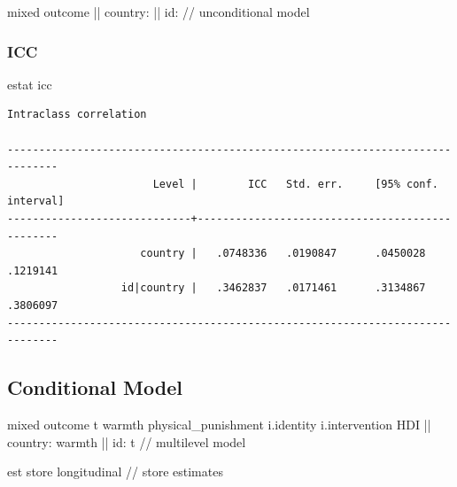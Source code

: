 \documentclass[
  letterpaper,
  DIV=11,
  numbers=noendperiod]{scrreprt}
\newenvironment{Shaded}{\begin{snugshade}}{\end{snugshade}}
\newcommand{\CommentTok}[1]{\textcolor[rgb]{0.37,0.37,0.37}{#1}}
\newcommand{\KeywordTok}[1]{\textcolor[rgb]{0.00,0.23,0.31}{#1}}
\newcommand{\NormalTok}[1]{\textcolor[rgb]{0.00,0.23,0.31}{#1}}
\begin{document}
\begin{Shaded}
\begin{Highlighting}[]
\NormalTok{mixed outcome || country: || id: }\CommentTok{// unconditional model}
\end{Highlighting}
\end{Shaded}

\subsubsection{ICC}\label{icc-1}

\begin{Shaded}
\begin{Highlighting}[]

\KeywordTok{estat}\NormalTok{ icc}
\end{Highlighting}
\end{Shaded}

\begin{verbatim}
Intraclass correlation

------------------------------------------------------------------------------
                       Level |        ICC   Std. err.     [95% conf. interval]
-----------------------------+------------------------------------------------
                     country |   .0748336   .0190847      .0450028    .1219141
                  id|country |   .3462837   .0171461      .3134867    .3806097
------------------------------------------------------------------------------
\end{verbatim}

\subsection{Conditional Model}\label{conditional-model-1}

\begin{Shaded}
\begin{Highlighting}[]

\NormalTok{mixed outcome t warmth physical\_punishment i.}\KeywordTok{identity}\NormalTok{ i.intervention HDI || country: warmth || id: t }\CommentTok{// multilevel model}

\KeywordTok{est} \KeywordTok{store}\NormalTok{ longitudinal }\CommentTok{// store estimates}
\end{Highlighting}
\end{Shaded}
\end{document}

